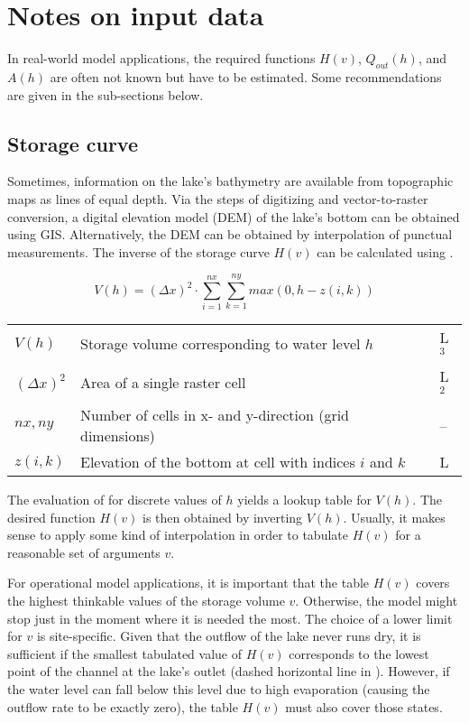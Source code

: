 
\section{Notes on input data} \label{sec:resStor_inputs}

In real-world model applications, the required functions $H(v)$, $Q_{out}(h)$, and $A(h)$ are often not known but have to be estimated. Some recommendations are given in the sub-sections below.

\subsection{Storage curve}
Sometimes, information on the lake's bathymetry are available from topographic maps as lines of equal depth. Via the steps of digitizing and vector-to-raster conversion, a digital elevation model (DEM) of the lake's bottom can be obtained using GIS. Alternatively, the DEM can be obtained by interpolation of punctual measurements. The inverse of the storage curve $H(v)$ can be calculated using .

\begin{equation}
V(h)= (\Delta x)^2 \cdot \sum_{i=1}^{nx} \sum_{k=1}^{ny} max(0, h - z(i,k)) \label{eqn:resStor_storageCurveFromDEM}
\end{equation}

\begin{tabular}{lp{}l}
  $V(h)$ & Storage volume corresponding to water level $h$ & L$^3$ \\
  $(\Delta x)^2$ & Area of a single raster cell & L$^2$ \\
  $nx, ny$ & Number of cells in x- and y-direction (grid dimensions) & -- \\
  $z(i,k)$ & Elevation of the bottom at cell with indices $i$ and $k$ & L \\
\end{tabular}

\medskip
The evaluation of  for discrete values of $h$ yields a lookup table for $V(h)$. The desired function $H(v)$ is then obtained by inverting $V(h)$. Usually, it makes sense to apply some kind of interpolation in order to tabulate $H(v)$ for a reasonable set of arguments $v$.

For operational model applications, it is important that the table $H(v)$ covers the highest thinkable values of the storage volume $v$. Otherwise, the model might stop just in the moment where it is needed the most. The choice of a lower limit for $v$ is site-specific. Given that the outflow of the lake never runs dry, it is sufficient if the smallest tabulated value of $H(v)$ corresponds to the lowest point of the channel at the lake's outlet (dashed horizontal line in ). However, if the water level can fall below this level due to high evaporation (causing the outflow rate to be exactly zero), the table $H(v)$ must also cover those states.

